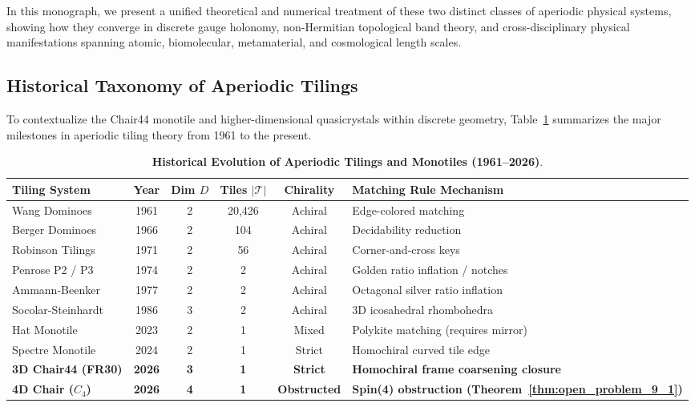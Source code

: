 \documentclass[11pt,a4paper]{article}
\theoremstyle{definition}
\begin{document}
In this monograph, we present a unified theoretical and numerical treatment of these two distinct classes of aperiodic physical systems, showing how they converge in discrete gauge holonomy, non-Hermitian topological band theory, and cross-disciplinary physical manifestations spanning atomic, biomolecular, metamaterial, and cosmological length scales.

\subsection{Historical Taxonomy of Aperiodic Tilings}

To contextualize the Chair44 monotile and higher-dimensional quasicrystals within discrete geometry, Table~\ref{tab:tiling_history} summarizes the major milestones in aperiodic tiling theory from 1961 to the present.

\begin{table}[h!]
\centering
\small
\caption{\textbf{Historical Evolution of Aperiodic Tilings and Monotiles (1961--2026)}.}
\label{tab:tiling_history}
\begin{tabularx}{\textwidth}{@{}lccccX@{}}
\toprule
\textbf{Tiling System} & \textbf{Year} & \textbf{Dim $D$} & \textbf{Tiles $|\mathcal{T}|$} & \textbf{Chirality} & \textbf{Matching Rule Mechanism} \\
\midrule
Wang Dominoes & 1961 & 2 & 20,426 & Achiral & Edge-colored matching \\
Berger Dominoes & 1966 & 2 & 104 & Achiral & Decidability reduction \\
Robinson Tilings & 1971 & 2 & 56 & Achiral & Corner-and-cross keys \\
Penrose P2 / P3 & 1974 & 2 & 2 & Achiral & Golden ratio inflation / notches \\
Ammann-Beenker & 1977 & 2 & 2 & Achiral & Octagonal silver ratio inflation \\
Socolar-Steinhardt & 1986 & 3 & 2 & Achiral & 3D icosahedral rhombohedra \\
Hat Monotile & 2023 & 2 & 1 & Mixed & Polykite matching (requires mirror) \\
Spectre Monotile & 2024 & 2 & 1 & Strict & Homochiral curved tile edge \\
\textbf{3D Chair44 (FR30)} & \textbf{2026} & \textbf{3} & \textbf{1} & \textbf{Strict} & \textbf{Homochiral frame coarsening closure} \\
\textbf{4D Chair ($C_4$)} & \textbf{2026} & \textbf{4} & \textbf{1} & \textbf{Obstructed} & \textbf{Spin(4) obstruction (Theorem~\ref{thm:open_problem_9_1})} \\
\bottomrule
\end{tabularx}
\end{table}
\end{document}
